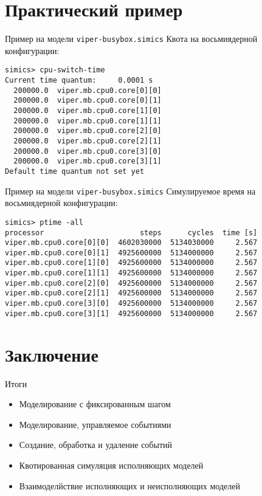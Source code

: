 \documentclass{beamer}
\begin{document}
% 
% 

\section{Практический пример}

\begin{frame}[fragile]{Пример на модели \texttt{viper-busybox.simics}}
Квота на восьмиядерной конфигурации:
\begin{verbatim}
simics> cpu-switch-time
Current time quantum:     0.0001 s
  200000.0  viper.mb.cpu0.core[0][0]
  200000.0  viper.mb.cpu0.core[0][1]
  200000.0  viper.mb.cpu0.core[1][0]
  200000.0  viper.mb.cpu0.core[1][1]
  200000.0  viper.mb.cpu0.core[2][0]
  200000.0  viper.mb.cpu0.core[2][1]
  200000.0  viper.mb.cpu0.core[3][0]
  200000.0  viper.mb.cpu0.core[3][1]
Default time quantum not set yet
\end{verbatim}

\end{frame}


\begin{frame}[fragile]{Пример на модели \texttt{viper-busybox.simics}}
Симулируемое время на восьмиядерной конфигурации:
\begin{verbatim}
simics> ptime -all
processor                      steps      cycles  time [s]
viper.mb.cpu0.core[0][0]  4602030000  5134030000     2.567
viper.mb.cpu0.core[0][1]  4925600000  5134000000     2.567
viper.mb.cpu0.core[1][0]  4925600000  5134000000     2.567
viper.mb.cpu0.core[1][1]  4925600000  5134000000     2.567
viper.mb.cpu0.core[2][0]  4925600000  5134000000     2.567
viper.mb.cpu0.core[2][1]  4925600000  5134000000     2.567
viper.mb.cpu0.core[3][0]  4925600000  5134000000     2.567
viper.mb.cpu0.core[3][1]  4925600000  5134000000     2.567
\end{verbatim}
    
\end{frame}

\section{Заключение}
\begin{frame}{Итоги}
\begin{itemize}
\item Моделирование с фиксированным шагом
\item Моделирование, управляемое событиями
\item Создание, обработка и удаление событий
\item Квотированная симуляция исполняющих моделей
\item Взаимоделйствие исполняющих и неисполняющих моделей
\end{itemize}

\end{frame}
\end{document}
